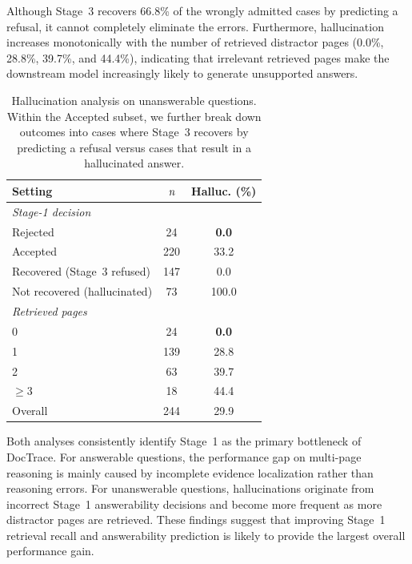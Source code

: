 \documentclass[letterpaper]{article} %
\begin{document}
Although Stage~3 recovers 66.8\% of the wrongly admitted cases by predicting a refusal, it cannot completely eliminate the errors. Furthermore, hallucination increases monotonically with the number of retrieved distractor pages (0.0\%, 28.8\%, 39.7\%, and 44.4\%), indicating that irrelevant retrieved pages make the downstream model increasingly likely to generate unsupported answers.

\begin{table}[h]
\centering
\begin{tabular}{lcc}
\toprule
\textbf{Setting} & $\emph n$ & \textbf{Halluc. (\%)}\\
\midrule
\multicolumn{3}{l}{\textit{Stage-1 decision}}\\
Rejected
&
24
&
\textbf{0.0}
\\
Accepted
&
220
&
33.2
\\
\quad Recovered (Stage~3 refused)
&
147
&
0.0
\\
\quad Not recovered (hallucinated)
&
73
&
100.0
\\
\midrule
\multicolumn{3}{l}{\textit{Retrieved pages}}\\
0
&
24
&
\textbf{0.0}
\\
1
&
139
&
28.8
\\
2
&
63
&
39.7
\\
$\ge3$
&
18
&
44.4
\\
\midrule
Overall
&
244
&
29.9
\\
\bottomrule
\end{tabular}
\caption{
Hallucination analysis on unanswerable questions. Within the Accepted subset, we further break down outcomes into cases where Stage~3 recovers by predicting a refusal versus cases that result in a hallucinated answer.
}
\label{tab:err-unanswerable}
\end{table}




Both analyses consistently identify Stage~1 as the primary bottleneck of
DocTrace. For answerable questions, the performance gap on multi-page reasoning
is mainly caused by incomplete evidence localization rather than reasoning
errors. For unanswerable questions, hallucinations originate from incorrect
Stage~1 answerability decisions and become more frequent as more distractor
pages are retrieved. These findings suggest that improving Stage~1 retrieval
recall and answerability prediction is likely to provide the largest overall
performance gain.
\end{document}
